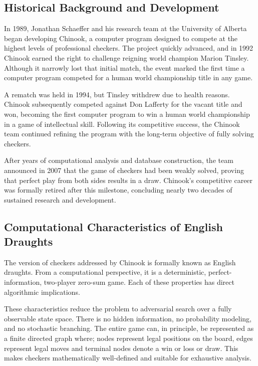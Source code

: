 \documentclass[11pt,a4paper]{report}
\begin{document}
\subsection{Historical Background and Development}
In 1989, Jonathan Schaeffer and his research team at the University of Alberta began developing Chinook, a computer program designed to compete at the
highest levels of professional checkers. The project quickly advanced, and in 1992 Chinook earned the right to challenge reigning world champion Marion Tinsley.
Although it narrowly lost that initial match, the event marked the first time a computer program competed for a human world championship title in any game.

A rematch was held in 1994, but Tinsley withdrew due to health reasons. Chinook subsequently competed against Don Lafferty for the vacant title and won, becoming
the first computer program to win a human world championship in a game of intellectual skill. Following its competitive success, the Chinook team continued refining
the program with the long-term objective of fully solving checkers.

After years of computational analysis and database construction, the team announced in 2007 that the game of checkers had been weakly solved, proving that perfect play
from both sides results in a draw. Chinook’s competitive career was formally retired after this milestone, concluding nearly two decades of sustained research and development.

\subsection{Computational Characteristics of English Draughts}
The version of checkers addressed by Chinook is formally known as English draughts. From a computational perspective,
it is a deterministic, perfect-information, two-player zero-sum game. Each of these properties has direct
algorithmic implications.

These characteristics reduce the problem to adversarial search over a fully observable state space. There is no
hidden information, no probability modeling, and no stochastic branching. The entire game can, in principle, be
represented as a finite directed graph where; nodes represent legal positions on the board, edges represent legal moves
and terminal nodes denote a win or loss or draw. This makes checkers mathematically well-defined and suitable for exhaustive analysis.
\end{document}
